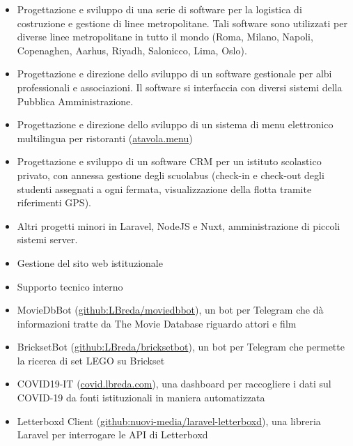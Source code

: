 \documentclass[10pt,a4paper]{altacv}
\begin{document}
\begin{itemize}
\item Progettazione e sviluppo di una serie di software per la logistica di costruzione e gestione di linee metropolitane. Tali software sono utilizzati per diverse linee metropolitane in tutto il mondo (Roma, Milano, Napoli, Copenaghen, Aarhus, Riyadh, Salonicco, Lima, Oslo).
\item Progettazione e direzione dello sviluppo di un software gestionale per albi professionali e associazioni. Il software si interfaccia con diversi sistemi della Pubblica Amministrazione.
\item Progettazione e direzione dello sviluppo di un sistema di menu elettronico multilingua per ristoranti (\href{https://atavola.menu}{atavola.menu})
\item Progettazione e sviluppo di un software CRM per un istituto scolastico privato, con annessa gestione degli scuolabus (check-in e check-out degli studenti assegnati a ogni fermata, visualizzazione della flotta tramite riferimenti GPS).
\item Altri progetti minori in Laravel, NodeJS e Nuxt, amministrazione di piccoli sistemi server.
\end{itemize}

\divider

\begin{itemize}
\item Gestione del sito web istituzionale
\item Supporto tecnico interno
\end{itemize}

\pagebreak

\begin{itemize}
\item MovieDbBot (\href{https://github.com/LBreda/moviedbbot}{github:LBreda/moviedbbot}), un bot per Telegram che dà informazioni tratte da The Movie Database riguardo attori e film
\item BricksetBot (\href{https://github.com/LBreda/bricksetbot}{github:LBreda/bricksetbot}), un bot per Telegram che permette la ricerca di set LEGO su Brickset 
\item COVID19-IT (\href{https://covid19.lbreda.com/}{covid.lbreda.com}), una dashboard per raccogliere i dati sul COVID-19 da fonti istituzionali in maniera automatizzata
\item Letterboxd Client (\href{https://github.com/nuovi-media/laravel-letterboxd}{github:nuovi-media/laravel-letterboxd}), una libreria Laravel per interrogare le API di Letterboxd
\end{itemize}
\end{document}

